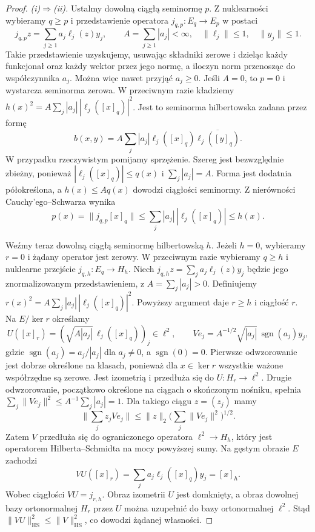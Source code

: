 \begin{proof}
\emph{(i)$\Rightarrow$(ii).} Ustalmy dowolną ciągłą seminormę $p$.
Z nuklearności wybieramy $q\ge p$ i przedstawienie operatora
$j_{q,p}:E_q\to E_p$ w postaci
\[
 j_{q,p}z=\sum_{j\ge1}a_j\ell_j(z)y_j,\qquad
 A=\sum_{j\ge1}|a_j|<\infty,\quad
 \|\ell_j\|\le1,\quad\|y_j\|\le1.
\]
Takie przedstawienie uzyskujemy, usuwając składniki
zerowe i dzieląc każdy funkcjonał oraz każdy wektor
przez jego normę, a iloczyn norm przenosząc do
współczynnika $a_j$. Można więc nawet przyjąć $a_j\ge0$. Jeśli $A=0$, to $p=0$ i wystarcza
seminorma zerowa. W przeciwnym razie kładziemy
$h(x)^2=A\sum_j|a_j|\,|\ell_j([x]_q)|^2$.
Jest to seminorma hilbertowska zadana przez formę
\[
 b(x,y)=A\sum_j|a_j|\ell_j([x]_q)
 \overline{\ell_j([y]_q)}.
\]
W przypadku rzeczywistym pomijamy sprzężenie.
Szereg jest bezwzględnie zbieżny, ponieważ
$|\ell_j([x]_q)|\le q(x)$ i $\sum_j|a_j|=A$.
Forma jest dodatnia półokreślona, a $h(x)\le Aq(x)$
dowodzi ciągłości seminormy.
Z nierówności Cauchy'ego--Schwarza wynika
\[
 p(x)=\bigl\|j_{q,p}[x]_q\bigr\|
 \le\sum_j|a_j|\,|\ell_j([x]_q)|
 \le h(x).
\]

Weźmy teraz dowolną ciągłą seminormę hilbertowską $h$.
Jeżeli $h=0$, wybieramy $r=0$ i żądany operator jest zerowy. W przeciwnym razie
wybieramy $q\ge h$ i nuklearne przejście $j_{q,h}:E_q\to H_h$.
Niech $j_{q,h}z=\sum_ja_j\ell_j(z)y_j$ będzie jego
znormalizowanym przedstawieniem, z $A=\sum_j|a_j|>0$.
Definiujemy $r(x)^2=A\sum_j|a_j|\,|\ell_j([x]_q)|^2$.
Powyższy argument daje $r\ge h$ i ciągłość $r$.
Na $E/\ker r$ określamy
\[
 U([x]_r)=(\sqrt{A|a_j|}\,\ell_j([x]_q))_j\in\ell^2,
\qquad
 Ve_j=A^{-1/2}\sqrt{|a_j|}\,\operatorname{sgn}(a_j)y_j,
\]
gdzie $\operatorname{sgn}(a_j)=a_j/|a_j|$ dla $a_j\ne0$,
a $\operatorname{sgn}(0)=0$. Pierwsze odwzorowanie jest dobrze określone
na klasach, ponieważ dla $x\in\ker r$ wszystkie
ważone współrzędne są zerowe. Jest izometrią
i przedłuża się do $U:H_r\to\ell^2$.
Drugie odwzorowanie, początkowo określone na ciągach
o skończonym nośniku, spełnia
$\sum_j\|Ve_j\|^2\le A^{-1}\sum_j|a_j|=1$.
Dla takiego ciągu $z=(z_j)$ mamy
\[
 \Big\|\sum_j z_jVe_j\Big\|
 \le\|z\|_2\Big(\sum_j\|Ve_j\|^2\Big)^{1/2}.
\]
Zatem $V$ przedłuża się do ograniczonego operatora
$\ell^2\to H_h$, który jest operatorem
Hilberta--Schmidta na mocy powyższej sumy.
Na gęstym obrazie $E$ zachodzi
\[
 VU([x]_r)=\sum_j a_j\ell_j([x]_q)y_j=[x]_h.
\]
Wobec ciągłości $VU=j_{r,h}$.
Obraz izometrii $U$ jest domknięty, a obraz dowolnej
bazy ortonormalnej $H_r$ przez $U$ można uzupełnić
do bazy ortonormalnej $\ell^2$. Stąd
$\|VU\|_{\mathrm{HS}}^2\le\|V\|_{\mathrm{HS}}^2$,
co dowodzi żądanej własności.


\end{proof}
